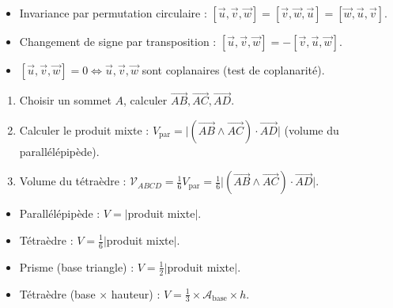\documentclass[11pt]{article}
\begin{document}
\begin{propriete}
\begin{itemize}
\item Invariance par permutation circulaire : $[\vec{u},\vec{v},\vec{w}] = [\vec{v},\vec{w},\vec{u}] = [\vec{w},\vec{u},\vec{v}]$.
\item Changement de signe par transposition : $[\vec{u},\vec{v},\vec{w}] = -[\vec{v},\vec{u},\vec{w}]$.
\item $[\vec{u},\vec{v},\vec{w}] = 0 \iff \vec{u},\vec{v},\vec{w}$ sont coplanaires (test de coplanarité).
\end{itemize}
\end{propriete}

\begin{methode}
\begin{enumerate}
\item Choisir un sommet $A$, calculer $\overrightarrow{AB},\overrightarrow{AC},\overrightarrow{AD}$.
\item Calculer le produit mixte : $V_{\text{par}} = \big|(\overrightarrow{AB}\wedge\overrightarrow{AC})\cdot\overrightarrow{AD}\big|$ (volume du parallélépipède).
\item Volume du tétraèdre : $\mathcal{V}_{ABCD} = \frac{1}{6} V_{\text{par}} = \frac{1}{6}\big|(\overrightarrow{AB}\wedge\overrightarrow{AC})\cdot\overrightarrow{AD}\big|$.
\end{enumerate}
\end{methode}

\begin{aretenir}
\begin{itemize}
\item Parallélépipède : $V = |$produit mixte$|$.
\item Tétraèdre : $V = \frac{1}{6}|$produit mixte$|$.
\item Prisme (base triangle) : $V = \frac{1}{2}|$produit mixte$|$.
\item Tétraèdre (base $\times$ hauteur) : $V = \frac{1}{3}\times\mathcal{A}_{\text{base}}\times h$.
\end{itemize}
\end{aretenir}
\end{document}
